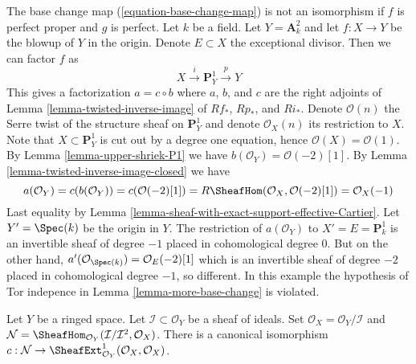 \begin{example}
\label{example-base-change-wrong}
The base change map (\ref{equation-base-change-map}) is not an
isomorphism if $f$ is perfect proper and $g$ is perfect.
Let $k$ be a field. Let $Y = \mathbf{A}^2_k$ and let $f : X \to Y$
be the blowup of $Y$ in the origin. Denote $E \subset X$ the
exceptional divisor. Then we can factor $f$ as
$$
X \xrightarrow{i} \mathbf{P}^1_Y \xrightarrow{p} Y
$$
This gives a factorization $a = c \circ b$ where
$a$, $b$, and $c$ are the right adjoints of
Lemma \ref{lemma-twisted-inverse-image}
of $Rf_*$, $Rp_*$, and $Ri_*$. Denote $\mathcal{O}(n)$ the
Serre twist of the structure sheaf on $\mathbf{P}^1_Y$ and
denote $\mathcal{O}_X(n)$ its restriction to $X$.
Note that $X \subset \mathbf{P}^1_Y$ is cut out by
a degree one equation, hence $\mathcal{O}(X) = \mathcal{O}(1)$.
By Lemma \ref{lemma-upper-shriek-P1} we have
$b(\mathcal{O}_Y) = \mathcal{O}(-2)[1]$.
By Lemma \ref{lemma-twisted-inverse-image-closed}
we have
$$
a(\mathcal{O}_Y) = c(b(\mathcal{O}_Y)) =
c(\mathcal{O}(-2)[1]) =
R\SheafHom(\mathcal{O}_X, \mathcal{O}(-2)[1]) =
\mathcal{O}_X(-1)
$$
Last equality by Lemma \ref{lemma-sheaf-with-exact-support-effective-Cartier}.
Let $Y' = \Spec(k)$ be the origin in $Y$. The restriction of
$a(\mathcal{O}_Y)$ to $X' = E = \mathbf{P}^1_k$
is an invertible sheaf of degree $-1$ placed in cohomological
degree $0$. But on the other hand,
$a'(\mathcal{O}_{\Spec(k)}) = \mathcal{O}_E(-2)[1]$
which is an invertible sheaf of degree $-2$ placed in
cohomological degree $-1$, so different. In this example
the hypothesis of Tor indepence in Lemma \ref{lemma-more-base-change}
is violated.
\end{example}

\begin{lemma}
\label{lemma-ext}
Let $Y$ be a ringed space. Let $\mathcal{I} \subset \mathcal{O}_Y$
be a sheaf of ideals. Set $\mathcal{O}_X = \mathcal{O}_Y/\mathcal{I}$ and
$\mathcal{N} =
\SheafHom_{\mathcal{O}_Y}(\mathcal{I}/\mathcal{I}^2, \mathcal{O}_X)$.
There is a canonical isomorphism
$c : \mathcal{N} \to
\SheafExt^1_{\mathcal{O}_Y}(\mathcal{O}_X, \mathcal{O}_X)
$.
\end{lemma}

